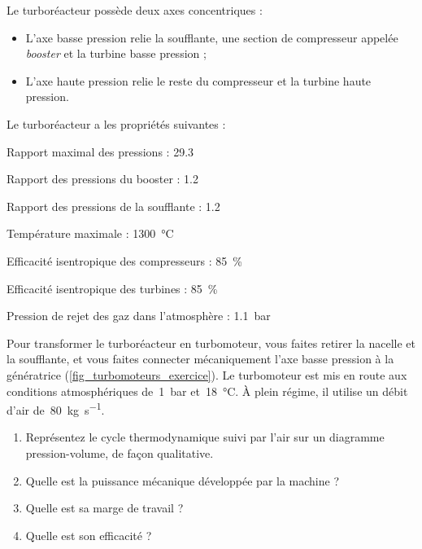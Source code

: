 	Le turboréacteur possède deux axes concentriques :
		
	\begin{itemize}
		\item L’axe basse pression relie la soufflante, une section de compresseur appelée \textit{booster} et la turbine basse pression ;
		\item L’axe haute pression relie le reste du compresseur et la turbine haute pression.
	\end{itemize}	

	Le turboréacteur a les propriétés suivantes :
		
	\begin{description}
		\item Rapport maximal des pressions : 						\tab \num{29,3}
		\item Rapport des pressions du booster : 					\tab \num{1,2}
		\item Rapport des pressions de la soufflante : 			\tab \num{1,2}
		\item Température maximale : 									\tab \SI{1300}{\degreeCelsius}
		\item Efficacité isentropique des compresseurs : 		\tab \SI{85}{\percent}
		\item Efficacité isentropique des turbines : 			\tab \SI{85}{\percent}
		\item Pression de rejet des gaz dans l’atmosphère : 	\tab \SI{1,1}{\bar}
	\end{description}

	Pour transformer le turboréacteur en turbomoteur, vous faites retirer la nacelle et la soufflante, et vous faites connecter mécaniquement l’axe basse pression à la génératrice (\cref{fig_turbomoteurs_exercice}). Le turbomoteur est mis en route aux conditions atmosphériques de~\SI{1}{\bar} et~\SI{18}{\degreeCelsius}. À plein régime, il utilise un débit d’air de~\SI{80}{\kilogram\per\second}.
	
	\begin{enumerate}
		\item Représentez le cycle thermodynamique suivi par l’air sur un diagramme pression-volume, de façon qualitative.
		\item Quelle est la puissance mécanique développée par la machine ?
		\item Quelle est sa marge de travail ?
		\item Quelle est son efficacité ?
	\end{enumerate}
	
